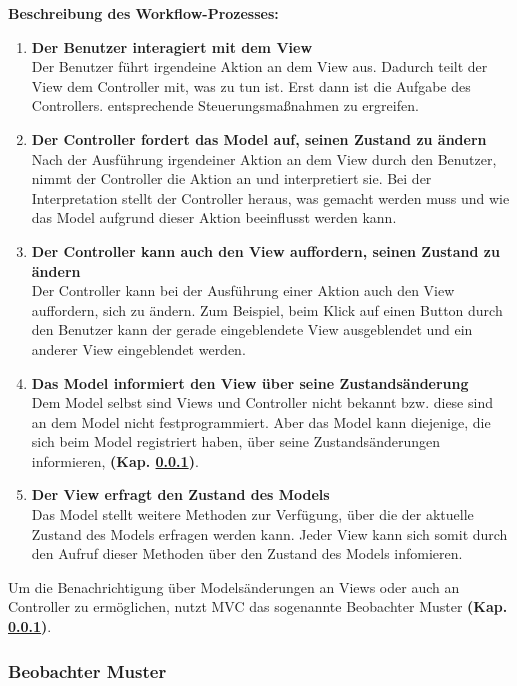 \textbf{Beschreibung des Workflow-Prozesses:}
\begin{enumerate}
\item \textbf{Der Benutzer interagiert mit dem View}\\
Der Benutzer führt irgendeine Aktion an dem View aus. Dadurch teilt der View dem Controller mit, was zu tun ist. Erst dann ist die Aufgabe des Controllers. entsprechende Steuerungsmaßnahmen zu ergreifen.

\item  \textbf{Der Controller fordert das Model auf, seinen Zustand zu ändern}\\
Nach der Ausführung irgendeiner Aktion an dem View durch den Benutzer, nimmt der Controller die Aktion an und interpretiert sie. Bei der Interpretation stellt der Controller heraus, was gemacht werden muss und wie das Model aufgrund dieser Aktion beeinflusst werden kann.

\item  \textbf{Der Controller kann auch den View auffordern, seinen Zustand zu ändern}\\
Der Controller kann bei der Ausführung einer Aktion auch den View auffordern, sich zu ändern. Zum Beispiel, beim Klick auf einen Button durch den Benutzer kann der gerade eingeblendete View ausgeblendet und ein anderer View eingeblendet werden.

\item  \textbf{Das Model informiert den View über seine Zustandsänderung}\\
Dem Model selbst sind Views und Controller nicht bekannt bzw. diese sind an dem Model nicht festprogrammiert. Aber das Model kann diejenige, die sich beim Model registriert haben, über seine Zustandsänderungen informieren, \textbf{(Kap. \ref{observer})}.

\item  \textbf{Der View erfragt den Zustand des Models}\\
Das Model stellt weitere Methoden zur Verfügung, über die der aktuelle Zustand des Models erfragen werden kann. 
Jeder View kann sich somit durch den Aufruf dieser Methoden über den Zustand des Models infomieren.

\end{enumerate}
Um die Benachrichtigung über Modelsänderungen an Views oder auch an Controller zu ermöglichen, nutzt MVC das sogenannte Beobachter Muster \textbf{(Kap. \ref{observer})}.

\subsubsection{Beobachter Muster}\label{observer}



